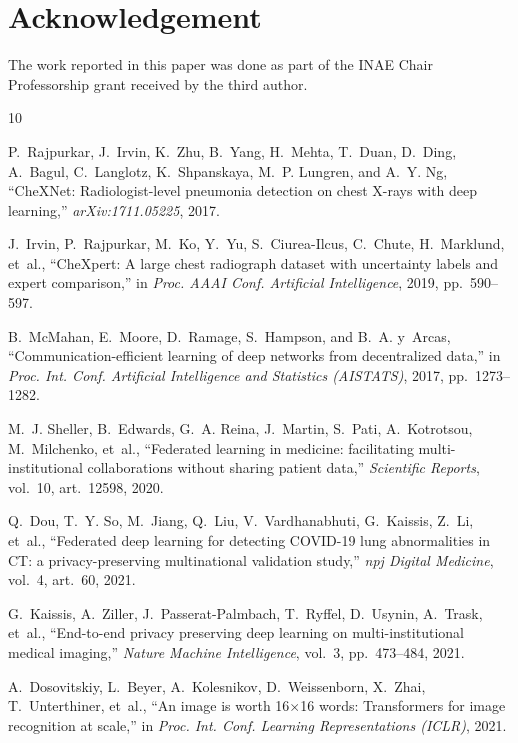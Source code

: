\documentclass[letterpaper, conference]{IEEEtran}
\begin{document}
\section{Acknowledgement}
The work reported in this paper was done as part of the INAE Chair Professorship grant received by the third author.

\begin{thebibliography}{10}

P.~Rajpurkar, J.~Irvin, K.~Zhu, B.~Yang, H.~Mehta, T.~Duan, D.~Ding, A.~Bagul,
C.~Langlotz, K.~Shpanskaya, M.~P. Lungren, and A.~Y. Ng,
``CheXNet: Radiologist-level pneumonia detection on chest X-rays with deep learning,''
\emph{arXiv:1711.05225}, 2017.

J.~Irvin, P.~Rajpurkar, M.~Ko, Y.~Yu, S.~Ciurea-Ilcus, C.~Chute, H.~Marklund, et~al.,
``CheXpert: A large chest radiograph dataset with uncertainty labels and expert comparison,''
in \emph{Proc. AAAI Conf. Artificial Intelligence}, 2019, pp.~590--597.

B.~McMahan, E.~Moore, D.~Ramage, S.~Hampson, and B.~A. y~Arcas,
``Communication-efficient learning of deep networks from decentralized data,''
in \emph{Proc. Int. Conf. Artificial Intelligence and Statistics (AISTATS)}, 2017,
pp.~1273--1282.

M.~J. Sheller, B.~Edwards, G.~A. Reina, J.~Martin, S.~Pati, A.~Kotrotsou,
M.~Milchenko, et~al.,
``Federated learning in medicine: facilitating multi-institutional collaborations
without sharing patient data,''
\emph{Scientific Reports}, vol.~10, art.~12598, 2020.

Q.~Dou, T.~Y. So, M.~Jiang, Q.~Liu, V.~Vardhanabhuti, G.~Kaissis, Z.~Li, et~al.,
``Federated deep learning for detecting COVID-19 lung abnormalities in CT: a
privacy-preserving multinational validation study,''
\emph{npj Digital Medicine}, vol.~4, art.~60, 2021.

G.~Kaissis, A.~Ziller, J.~Passerat-Palmbach, T.~Ryffel, D.~Usynin, A.~Trask, et~al.,
``End-to-end privacy preserving deep learning on multi-institutional medical imaging,''
\emph{Nature Machine Intelligence}, vol.~3, pp.~473--484, 2021.

A.~Dosovitskiy, L.~Beyer, A.~Kolesnikov, D.~Weissenborn, X.~Zhai, T.~Unterthiner, et~al.,
``An image is worth 16$\times$16 words: Transformers for image recognition at scale,''
in \emph{Proc. Int. Conf. Learning Representations (ICLR)}, 2021.


\end{thebibliography}
\end{document}
